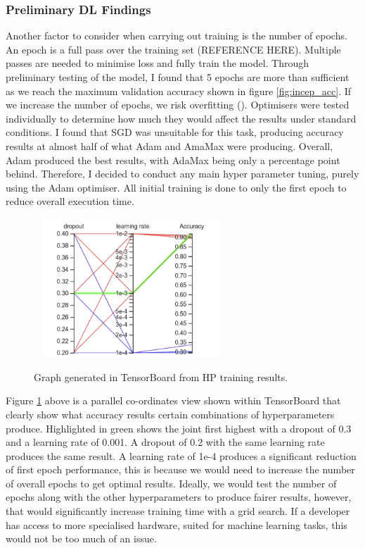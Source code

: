 \documentclass{article}
\begin{document}
\subsubsection*{Preliminary DL Findings}

Another factor to consider when carrying out training is the number of epochs. An epoch is a full pass over the training
set (REFERENCE HERE). Multiple passes are needed to minimise loss and fully train the model. Through preliminary testing of the model, 
I found that 5 epochs are more than sufficient as we reach the maximum validation accuracy shown in figure 
\ref{fig:incep_acc}. If we 
increase the number of epochs, we risk overfitting (\cite{geeksforgeeks}). Optimisers were tested individually to 
determine how much they would affect the results under standard conditions. I found that SGD was unsuitable for this 
task, producing accuracy results at almost half of what Adam and AmaMax were producing. Overall, Adam produced the best 
results, with AdaMax being only a percentage point behind. Therefore, I decided to conduct any main hyper parameter 
tuning, purely using the Adam optimiser. All initial training is done to only the first epoch to reduce overall 
execution time. 

\begin{figure}[h]\
    \centering
    \includegraphics[width=0.6\textwidth]{cross_graph.png}
    \caption{Graph generated in TensorBoard from HP training results.}
    \label{fig:cross}
\end{figure}

\break

Figure \ref{fig:cross} above is a parallel co-ordinates view shown within TensorBoard that clearly show what accuracy 
results 
certain combinations of hyperparameters produce. Highlighted in green shows the joint first highest with a dropout of 
0.3 and a learning rate of 0.001. A dropout of 0.2 with the same learning rate produces the same result. A learning rate
of 1e-4 produces a significant reduction of first epoch performance, this is because we would need to increase the 
number of overall epochs to get optimal results. Ideally, we would test the number of epochs along with the other 
hyperparameters to produce fairer results, however, that would significantly increase training time with a grid search. 
If a developer has access to more specialised hardware, suited for machine learning tasks, this would not be too much of
an issue.
\end{document}
